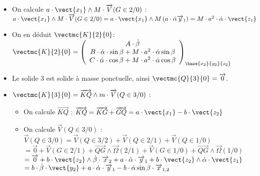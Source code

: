 \begin{multicols}{2}
\begin{corrige}
\begin{itemize}
\begin{itemize}
\item On calcule $a\cdot \vect{x_{1}}\wedge M\cdot \overrightarrow{V}(G\in 2/0)$ : 
$
a\cdot \vect{x_{1}}\wedge M\cdot \overrightarrow{V}(G\in 2/0)=
a\cdot \vect{x_{1}}\wedge M\left(a\cdot \dot{\alpha}\overrightarrow{y}_{1} \right)=
M\cdot a^2\cdot \dot{\alpha}\cdot \vect{z_{1}}
$

\item On en déduit $\vectmc{K}{2}{0}$: $
\vectmc{K}{2}{0}=\left(
\begin{array}{c}
A\cdot \dot{\beta}\\
B\cdot \dot{\alpha}\cdot \sin\beta+M\cdot a^2\cdot \dot{\alpha}\sin\beta\\
C\cdot \dot{\alpha}\cdot \cos\beta+M\cdot a^2\cdot \dot{\alpha}\cos\beta\\
\end{array}
\right)_{\base{{x}_2}{{y}_2}{{z}_2}}\\
$
\end{itemize}
\end{itemize}
\end{corrige}
\else
\fi


\ifprof
\begin{corrige}
\begin{itemize}
\item Le solide $3$ est solide à masse ponctuelle, ainsi $\vectmc{Q}{3}{0}=\overrightarrow{0}$.
\item $\vectmc{K}{3}{0}=\overrightarrow{KQ}\wedge m\cdot \overrightarrow{V}(Q\in 3/0)$ : 
\begin{itemize}
\item On calcule $\overrightarrow{KQ}$ : 
$
\overrightarrow{KQ}=\overrightarrow{KG}+\overrightarrow{GQ}=a\cdot \vect{x_{1}}-b\cdot \vect{z_2}
$
\item On calcule $\overrightarrow{V}(Q\in 3/0)$ : 
$
\overrightarrow{V}(Q\in 3/0)=\overrightarrow{V}(Q\in 3/2)+\overrightarrow{V}(Q\in 2/1)+\overrightarrow{V}(Q\in 1/0)
$
$=\overrightarrow{0}+\overrightarrow{V}(G\in 2/1)+\overrightarrow{QG}\wedge \overrightarrow{\Omega}(2/1)
+\overrightarrow{V}(G\in 1/0)+\overrightarrow{QG}\wedge \overrightarrow{\Omega}(1/0)$
$=\overrightarrow{0}+b\cdot \vect{z_2}\wedge \dot{\beta}\cdot \overrightarrow{x}_2+ a\cdot \dot{\alpha}\cdot \overrightarrow{y}_1+b\cdot \vect{z_2}\wedge \dot{\alpha}\cdot \vect{z_{1}}$
$=b\cdot \dot{\beta}\cdot \vect{y_{2}}+a\cdot \dot{\alpha}\cdot \overrightarrow{y}_1-b\cdot\dot{\alpha} \sin\beta\cdot \overrightarrow{x}_{1,2}$



\end{itemize}
\end{itemize}
\end{corrige}
\end{multicols}
